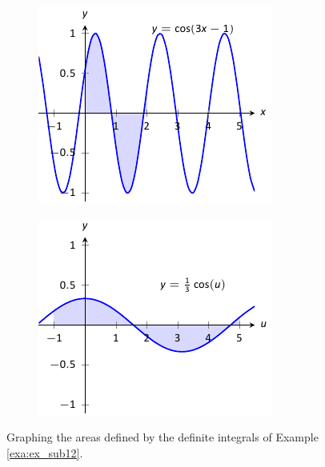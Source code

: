 \begin{solution}
{\begin{figure}
\centering
\begin{subfigure}{.5\textwidth}
  \centering
  \includegraphics[width=.8\textwidth]{figures/figsubst12a}
  \caption{}
  \label{fig:sub1}
\end{subfigure}%
\begin{subfigure}{.5\textwidth}
  \centering
  \includegraphics[width=.8\textwidth]{figures/figsubst12b}
  \caption{}
  \label{fig:sub2}
\end{subfigure}
\caption{Graphing the areas defined by the definite integrals of Example \ref{exa:ex_sub12}. \label{fig:subst12}}
\label{fig:test}
\end{figure}



%
%
%
%


}
\end{solution}
